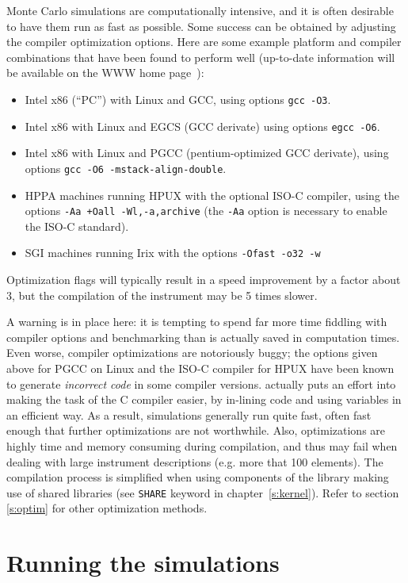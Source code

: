 Monte Carlo simulations are computationally intensive, and it is often desirable
to have them run as fast as possible. Some success can be obtained by adjusting
the compiler optimization options. Here are some example platform and compiler
combinations that have been found to perform well (up-to-date information will
be available on the \MCS WWW home page~\cite{mcstas_webpage}):
\begin{itemize}
\item Intel x86 (``PC'') with Linux and GCC, using options \verb+gcc -O3+.
\item Intel x86 with Linux and EGCS (GCC derivate) using
  options \verb+egcc -O6+.
\item Intel x86 with Linux and PGCC (pentium-optimized GCC derivate), using
  options \verb+gcc -O6 -mstack-align-double+.
\item HPPA machines running HPUX with the optional ISO-C compiler,
  using the options
  \verb|-Aa +Oall -Wl,-a,archive| (the \verb+-Aa+ option is necessary to
  enable the ISO-C standard).
\item SGI machines running Irix with the options
  \verb|-Ofast -o32 -w|
\end{itemize}
Optimization flags will typically result in a speed improvement by a factor
about 3, but the compilation of the instrument may be 5 times slower.

A warning is in place here: it is tempting to spend far more time fiddling with
compiler options and benchmarking than is actually saved in computation
times. Even worse, compiler optimizations are notoriously buggy; the options
given above for PGCC on Linux and the ISO-C compiler for HPUX have been known to
generate \emph{incorrect code} in some compiler versions. \MCS actually puts an
effort into making the task of the C compiler easier, by in-lining code and
using variables in an efficient way. As a result, \MCS simulations generally
run quite fast, often fast enough that further optimizations are not
worthwhile. Also, optimizations are highly time and memory consuming during
compilation, and thus may fail when dealing with large instrument descriptions
(e.g. more that 100 elements). The compilation process is simplified when using
components of the library making use of shared libraries (see \verb+SHARE+
keyword in chapter~\ref{s:kernel}). Refer to section \ref{s:optim} for other
optimization methods.

\section{Running the simulations}
\label{s:run-sim}

